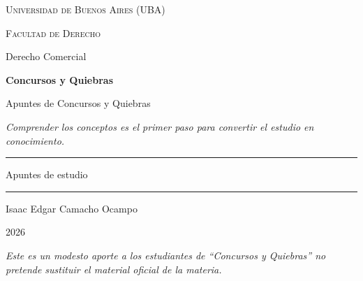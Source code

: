\documentclass[12pt,oneside]{book}
\newcommand{\universidad}{Universidad de Buenos Aires (UBA)}
\newcommand{\facultad}{Facultad de Derecho}
\newcommand{\departamento}{Derecho Comercial}
\newcommand{\materia}{Concursos y Quiebras}
\newcommand{\titulo}{Apuntes de Concursos y Quiebras}
\newcommand{\autor}{Isaac Edgar Camacho Ocampo}
\newcommand{\anio}{2026}
\begin{document}
\begin{titlepage}

\thispagestyle{empty}

\begin{center}

\vspace*{1cm}

{\large \textsc{\universidad}}

\vspace{0.2cm}

{\large \textsc{\facultad}}

\vspace{0.2cm}

{\large \departamento}

\vspace{3cm}

{\Huge \textbf{\materia}}

\vspace{1cm}

{\LARGE \titulo}

\vspace{0.8cm}

\textit{Comprender los conceptos es el primer paso para convertir el estudio en conocimiento.}

\vspace{1.2cm}

\rule{0.70\textwidth}{0.5pt}

\vspace{0.5cm}

{\large Apuntes de estudio}

\vspace{0.5cm}

\rule{0.70\textwidth}{0.5pt}

\vfill

{\large \autor}

\vspace{0.3cm}

{\large \anio}

\end{center}

\vfill

\begin{flushleft}
\textit{Este es un modesto aporte a los estudiantes de ``Concursos y Quiebras'' no pretende sustituir el material oficial de la materia.}
\end{flushleft}

\end{titlepage}
\end{document}
